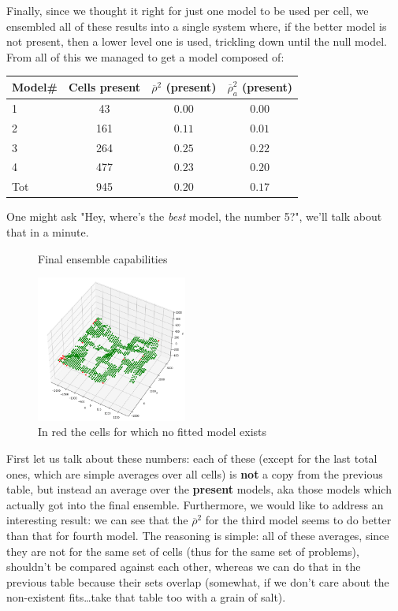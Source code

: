 \documentclass[9pt, a4paper]{IEEEtran}
\begin{document}
    Finally, since we thought it right for just one model to be used per cell, we ensembled all of these results into a single system where, if the better model is not present, then a lower level one is used, trickling down until the null model.
    From all of this we managed to get a model composed of:
    \begin{center}
        \begin{tabular} {l c c c}
            Model\# & Cells present & $\overline{\rho}^2$ (present) & $\overline{\rho}^2_a$ (present)\\
            \hline
            1 & 43 & $0.00$ & $0.00$\\
            2 & 161 & $0.11$ & $0.01$\\
            3 & 264 & $0.25$ & $0.22$\\
            4 & 477 & $0.23$ & $0.20$\\
            \hline
            Tot & 945 & $0.20$ & $0.17$
        \end{tabular}
    \end{center}

    One might ask "Hey, where's the \emph{best} model, the number 5?", we'll talk about that in a minute.

    \begin{figure}[h]
        \caption{Final ensemble capabilities}
        \centering
        \includegraphics[width=0.44\textwidth]{images/existent_models.png}
        \caption*{In red the cells for which no fitted model exists}
    \end{figure}

    First let us talk about these numbers: each of these (except for the last total ones, which are simple averages over all cells) is \textbf{not} a copy from the previous table, but instead an average over the \textbf{present} models, aka those models which actually got into the final ensemble. Furthermore, we would like to address an interesting result: we can see that the $\overline{\rho}^2$ for the third model seems to do better than that for fourth model. The reasoning is simple: all of these averages, since they are not for the same set of cells (thus for the same set of problems), shouldn't be compared against each other, whereas we can do that in the previous table because their sets overlap (somewhat, if we don't care about the non-existent fits\dots take that table too with a grain of salt).
\end{document}
